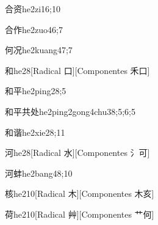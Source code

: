 \begin{verbete}{合资}{he2zi1}{6;10}
\end{verbete}

\begin{verbete}{合作}{he2zuo4}{6;7}
\end{verbete}

\begin{verbete}{何况}{he2kuang4}{7;7}
\end{verbete}

\begin{verbete}{和}{he2}{8}[Radical 口][Componentes 禾口]
\end{verbete}

\begin{verbete}{和平}{he2ping2}{8;5}
\end{verbete}

\begin{verbete}{和平共处}{he2ping2gong4chu3}{8;5;6;5}
\end{verbete}

\begin{verbete}{和谐}{he2xie2}{8;11}
\end{verbete}

\begin{verbete}{河}{he2}{8}[Radical 水][Componentes 氵可]
\end{verbete}

\begin{verbete}{河蚌}{he2bang4}{8;10}
\end{verbete}

\begin{verbete}{核}{he2}{10}[Radical 木][Componentes 木亥]
\end{verbete}

\begin{verbete}{荷}{he2}{10}[Radical 艸][Componentes 艹何]
\end{verbete}


